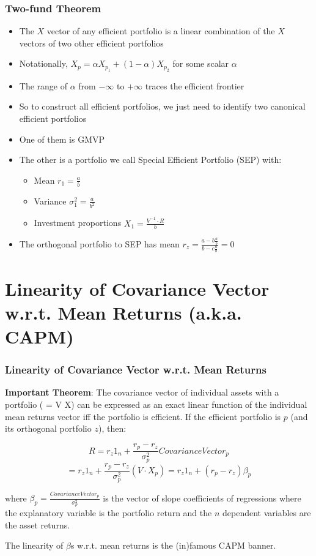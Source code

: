 \documentclass{beamer}
\begin{document}
\begin{frame}
\frametitle{Two-fund Theorem}
\begin{itemize}
\item The $X$ vector of any efficient portfolio is a linear combination of the $X$ vectors of two other efficient portfolios
\item Notationally, $X_p = \alpha X_{p_1} + (1-\alpha) X_{p_2}$ for some scalar $\alpha$
\item The range of $\alpha$ from $-\infty$ to $+\infty$ traces the efficient frontier
\item So to construct all efficient portfolios, we just need to identify two canonical efficient portfolios
\item One of them is GMVP
\item The other is a portfolio we call Special Efficient Portfolio (SEP) with:
\begin{itemize}
\item Mean $r_1  = \frac a b$
\item Variance $\sigma_1^2 = \frac a {b^2}$
\item Investment proportions $X_1 = \frac {V^{-1} \cdot R} {b}$
\end{itemize}
\item The orthogonal portfolio to SEP has mean $r_z = \frac {a - b \frac a b} {b - c \frac a b} = 0$
\end{itemize}
\end{frame}


\section{Linearity of Covariance Vector w.r.t. Mean Returns (a.k.a. CAPM)}

\begin{frame}
\frametitle{Linearity of Covariance Vector w.r.t. Mean Returns}

{\bf Important Theorem}: The covariance vector of individual assets with a portfolio ( = V X) can be expressed as an exact linear function of the individual mean returns vector iff the portfolio is efficient. If the efficient portfolio is $p$ (and its orthogonal portfolio $z$), then:

$$R = r_z 1_n + \frac {r_p - r_z} {\sigma_p^2} CovarianceVector_p$$
$$ = r_z 1_n + \frac {r_p - r_z} {\sigma_p^2} (V \cdot X_p) = r_z 1_n +  (r_p - r_z) \beta_p$$

where $\beta_p = \frac {CovarianceVector_p} {\sigma_p^2}$ is the vector of slope coefficients of regressions where the explanatory variable is the portfolio return and the $n$ dependent variables are the asset returns.

The linearity of $\beta$s w.r.t. mean returns is the (in)famous CAPM banner.
\end{frame}
\end{document}
